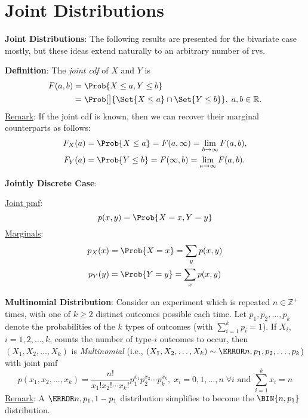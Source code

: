 \section*{Joint Distributions}
\textbf{Joint Distributions}: The following results are presented for the bivariate case mostly, but
these ideas extend naturally to an arbitrary number of rvs.
\begin{Regular}
    \textbf{Definition}: The \emph{joint cdf} of $ X $ and $ Y $ is
    \begin{align*}
        F(a,b)
         & =\Prob{X\le a,Y\le b}                                            \\
         & =\Prob[\big]{\Set{X\le a}\cap \Set{Y\le b}},\; a,b\in\mathbb{R}.
    \end{align*}
    \tcblower{}
    \underline{Remark}: If the joint cdf is known, then we can recover their marginal counterparts as
    follows:
    \begin{align*}
        F_X(a) & =\Prob{X\le a}=F(a,\infty)=\lim\limits_{{b} \to {\infty}} F(a,b), \\
        F_Y(a) & =\Prob{Y\le b}=F(\infty,b)=\lim\limits_{{a} \to {\infty}} F(a,b).
    \end{align*}
\end{Regular}
\begin{Regular}
    \textbf{Jointly Discrete Case}:

    \underline{Joint pmf}:
    \[ p(x,y)=\Prob{X=x,Y=y} \]
    \underline{Marginals}:
    \begin{align*}
        p_X(x) & =\Prob{X=x}=\sum_y p(x,y) \\
        p_Y(y) & =\Prob{Y=y}=\sum_x p(x,y)
    \end{align*}
\end{Regular}
\begin{Regular}
    \textbf{Multinomial Distribution}: Consider an experiment which is repeated $ n\in\mathbb{Z}^+ $ times,
    with one of $ k\ge 2 $ distinct outcomes possible each time. Let $ p_1,p_2,\ldots,p_k $ denote the probabilities
    of the $ k $ types of outcomes (with $ \sum_{i=1}^{k} p_i=1 $). If $ X_i $, $ i=1,2,\ldots,k $, counts the number of
    type-$i$ outcomes to occur, then $ (X_1,X_2,\ldots,X_k) $ is \emph{Multinomial} (i.e., $ (X_1,X_2,\ldots,X_k) \sim \MN{n,p_1,p_2,\ldots,p_k} $)
    with joint pmf
    \[ p(x_1,x_2,\ldots,x_k)=\frac{n!}{x_1!x_2!\cdots x_k!}p_1^{x_1}p_2^{x_2}\cdots p_k^{x_k},\; x_i=0,1,\ldots,n\;\forall i\text{ and }\sum_{i=1}^{k} x_i=n  \]
    \tcblower{}
    \underline{Remark}: A $ \MN{n,p_1,1-p_1} $ distribution simplifies to become the $ \BIN{n,p_1} $ distribution.
\end{Regular}
